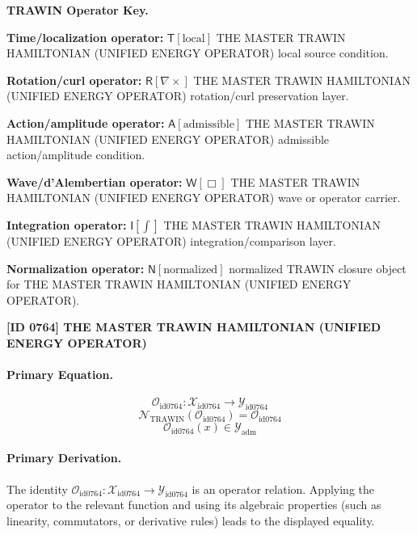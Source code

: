 \par\vspace{0.45\baselineskip}
\noindent\begin{minipage}[t]{\linewidth}
\begingroup
\small
\raggedright
\textbf{TRAWIN Operator Key.}\par
\noindent\textbf{Time/localization operator:} $\mathsf{T}\!\left[\mathrm{local}\right]$ THE MASTER TRAWIN HAMILTONIAN (UNIFIED ENERGY OPERATOR) local source condition.\par
\noindent\textbf{Rotation/curl operator:} $\mathsf{R}\!\left[\nabla\times\right]$ THE MASTER TRAWIN HAMILTONIAN (UNIFIED ENERGY OPERATOR) rotation/curl preservation layer.\par
\noindent\textbf{Action/amplitude operator:} $\mathsf{A}\!\left[\mathrm{admissible}\right]$ THE MASTER TRAWIN HAMILTONIAN (UNIFIED ENERGY OPERATOR) admissible action/amplitude condition.\par
\noindent\textbf{Wave/d'Alembertian operator:} $\mathsf{W}\!\left[\Box\right]$ THE MASTER TRAWIN HAMILTONIAN (UNIFIED ENERGY OPERATOR) wave or operator carrier.\par
\noindent\textbf{Integration operator:} $\mathsf{I}\!\left[\int\right]$ THE MASTER TRAWIN HAMILTONIAN (UNIFIED ENERGY OPERATOR) integration/comparison layer.\par
\noindent\textbf{Normalization operator:} $\mathsf{N}\!\left[\mathrm{normalized}\right]$ normalized TRAWIN closure object for THE MASTER TRAWIN HAMILTONIAN (UNIFIED ENERGY OPERATOR).\par
\endgroup
\end{minipage}

\clearpage
\noindent\textbf{[ID 0764] THE MASTER TRAWIN HAMILTONIAN (UNIFIED ENERGY OPERATOR)}\par
\vspace{0.35em}
\paragraph{Primary Equation.}
\[
\mathcal{O}_{\mathrm{id0764}}:\mathcal{X}_{\mathrm{id0764}}\longrightarrow\mathcal{Y}_{\mathrm{id0764}}
\]
\[
\mathcal{N}_{\mathrm{TRAWIN}}(\mathcal{O}_{\mathrm{id0764}})=\mathcal{O}_{\mathrm{id0764}}
\]
\[
\mathcal{O}_{\mathrm{id0764}}(x)\in\mathcal{Y}_{\mathrm{adm}}
\]

\paragraph{Primary Derivation.}
The identity \( \mathcal{O}_{\mathrm{id0764}}:\mathcal{X}_{\mathrm{id0764}}\longrightarrow\mathcal{Y}_{\mathrm{id0764}} \) is an operator relation. Applying the operator to the relevant function and using its algebraic properties (such as linearity, commutators, or derivative rules) leads to the displayed equality.
